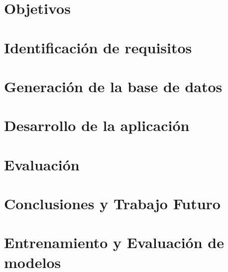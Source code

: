 \documentclass[11pt,a4paper,spanish]{book}
\begin{document}
\chapter{Objetivos}\label{chap:objetivos}


\chapter{Identificación de requisitos}\label{chap:requisitos}


\chapter{Generación de la base de datos}\label{chap:generar:dataset}


\chapter{Desarrollo de la aplicación}\label{chap:desarrollo:algoritmo}
 

\chapter{Evaluación}\label{chap:eval}


\chapter{Conclusiones y Trabajo Futuro}\label{chap:conclusiones}



% 
% 
\newpage %


\lstlistoflistings

\appendix

% 

\chapter{Entrenamiento y Evaluación de modelos}\label{app:modelos}

\end{document}
